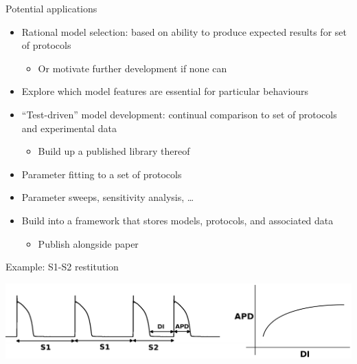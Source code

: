 \documentclass[t,xcolor={usenames,dvipsnames}]{beamer}
\newcommand{\subitem}[1]{\begin{itemize}[<.->]\item #1 \end{itemize}}
\begin{document}
\begin{frame}{Potential applications}
\begin{itemize}
\item Rational model selection: based on ability to produce expected results for set of protocols
  \subitem{Or motivate further development if none can}
\item Explore which model features are essential for particular behaviours
\item ``Test-driven'' model development: continual comparison to set of protocols and experimental data
  \subitem{Build up a published library thereof}
\item Parameter fitting to a set of protocols
\item Parameter sweeps, sensitivity analysis, \ldots
\item Build into a framework that stores models, protocols, and associated data
  \subitem{Publish alongside paper}
\end{itemize}
\end{frame}

\begin{frame}{Example: S1-S2 restitution}
\begin{center}
\includegraphics[width=\textwidth]{S1S2}
\end{center}
\end{frame}
\end{document}
